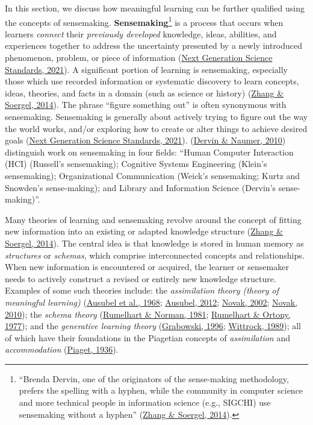 \documentclass[letterpaper, nobind]{templates/ociamthesis}
\begin{document}
In this section, we discuss how meaningful learning can be further
qualified using the concepts of sensemaking.
\textbf{Sensemaking}\footnote{
  ``Brenda Dervin, one of the originators of the sense-making methodology, prefers the spelling with a hyphen, while the community in computer science and more technical people in information science (e.g., SIGCHI) use sensemaking without a hyphen'' (\protect\hyperlink{ref-zhang2014towards}{Zhang \& Soergel, 2014}).} is a
process that occurs when learners \emph{connect} their \emph{previously developed}
knowledge, ideas, abilities, and experiences together to address the
uncertainty presented by a newly introduced phenomenon, problem, or
piece of information (\protect\hyperlink{ref-ngss_sensemaking}{Next Generation Science Standards, 2021}). A significant portion of
learning is sensemaking, especially those which use recorded information
or systematic discovery to learn concepts, ideas, theories, and facts in
a domain (such as science or history) (\protect\hyperlink{ref-zhang2014towards}{Zhang \& Soergel, 2014}). The phrase
``figure something out'' is often synonymous with sensemaking. Sensemaking
is generally about actively trying to figure out the way the world
works, and/or exploring how to create or alter things to achieve desired
goals (\protect\hyperlink{ref-ngss_sensemaking}{Next Generation Science Standards, 2021}). (\protect\hyperlink{ref-dervin2010sensemaking}{Dervin \& Naumer, 2010}) distinguish work on
sensemaking in four fields: ``Human Computer Interaction (HCI) (Russell's
sensemaking); Cognitive Systems Engineering (Klein's sensemaking);
Organizational Communication (Weick's sensemaking; Kurtz and Snowden's
sense-making); and Library and Information Science (Dervin's
sense-making)''.

Many theories of learning and sensemaking revolve around the concept of
fitting new information into an existing or adapted knowledge structure
(\protect\hyperlink{ref-zhang2014towards}{Zhang \& Soergel, 2014}). The central idea is that knowledge is stored in
human memory as \emph{structures} or \emph{schemas}, which comprise interconnected
concepts and relationships. When new information is encountered or
acquired, the learner or sensemaker needs to actively construct a
revised or entirely new knowledge structure. Examples of some such
theories include: the \emph{assimilation theory (theory of meaningful
learning)}
(\protect\hyperlink{ref-ausubel1968educational}{Ausubel et al., 1968}; \protect\hyperlink{ref-ausubel2012acquisition}{Ausubel, 2012}; \protect\hyperlink{ref-novak2002meaningful}{Novak, 2002}; \protect\hyperlink{ref-novak2010learninga}{Novak, 2010});
the \emph{schema theory}
(\protect\hyperlink{ref-rumelhart1981accretion}{Rumelhart \& Norman, 1981}; \protect\hyperlink{ref-rumelhart1977representation}{Rumelhart \& Ortony, 1977}); and the
\emph{generative learning theory}
(\protect\hyperlink{ref-grabowski1996generative}{Grabowski, 1996}; \protect\hyperlink{ref-wittrock1989generative}{Wittrock, 1989}); all of which have
their foundations in the Piagetian concepts of \emph{assimilation} and
\emph{accommodation} (\protect\hyperlink{ref-piaget1936origins}{Piaget, 1936}).
\end{document}

